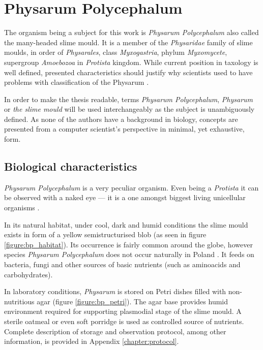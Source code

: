 \section{Physarum Polycephalum}
\label{section:background_physarum}

The organism being a subject for this work is \textit{Physarum Polycephalum} also called the many-headed slime mould. It is a member of the \textit{Physaridae} family of slime moulds, in order of \textit{Physarales}, class \textit{Myxogastria}, phylum \textit{Myxomycete}, supergroup \textit{Amoebozoa} in \textit{Protista} kingdom. While current position in taxology is well defined, presented characteristics should justify why scientists used to have problems with classification of the Physarum \cite{stephenson1994myxomycetes}.

In order to make the thesis readable, terms \textit{Physarum Polycephalum}, \textit{Physarum} or \textit{the slime mould} will be used interchangeably as the subject is unambiguously defined. As none of the authors have a background in biology, concepts are presented from a computer scientist's perspective in minimal, yet exhaustive, form.


\subsection{Biological characteristics}

\textit{Physarum Polycephalum} is a very peculiar organism. Even being a \textit{Protista} it can be observed with a naked eye --- it is a one amongst biggest living unicellular organisms \cite{stephenson1994myxomycetes}. 

In its natural habitat, under cool, dark and humid conditions the slime mould exists in form of a yellow semistructurised blob (as seen in figure \ref{figure:bp_habitat}). Its occurrence is fairly common around the globe, however species \textit{Physarum Polycephalum} does not occur naturally in Poland \cite{narkiewicz2013grzyby}. It feeds on bacteria, fungi and other sources of basic nutrients (such as aminoacids and carbohydrates).

In laboratory conditions, \textit{Physarum} is stored on Petri dishes filled with non-nutritious agar (figure \ref{figure:bp_petri}). The agar base provides humid environment required for supporting plasmodial stage of the slime mould. A sterile oatmeal or even soft porridge is used as controlled source of nutrients. Complete description of storage and observation protocol, among other information, is provided in Appendix \ref{chapter:protocol}.

